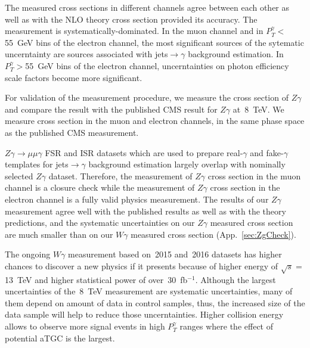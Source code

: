The measured cross sections in different channels agree between each other as well as with the NLO theory cross section provided its accuracy. The measurement is systematically-dominated. In the muon channel and in $P_T^{\gamma}<$55~GeV bins of the electron channel, the most significant sources of the sytematic uncerntainty are sources associated with jets$\rightarrow\gamma$ background estimation. In $P_T^{\gamma}>$55~GeV bins of the electron channel, uncerntainties on photon efficiency scale factors become more significant.

For validation of the measurement procedure, we measure the cross section of $Z\gamma$ and compare the result with the published CMS result for $Z\gamma$ at~8~TeV. We measure cross section in the muon and electron channels, in the same phase space as the published CMS measurement. 

$Z\gamma\rightarrow\mu\mu\gamma$ FSR and ISR datasets which are used to prepare real-$\gamma$ and fake-$\gamma$ templates for jets$\rightarrow\gamma$ background estimation largely overlap with nominally selected $Z\gamma$ dataset. Therefore, the measurement of $Z\gamma$ cross section in the muon channel is a closure check while the measurement of $Z\gamma$ cross section in the electron channel is a fully valid physics measurement. The results of our $Z\gamma$ measurement agree well with the published results as well as with the theory predictions, and the systematic uncertainties on our $Z\gamma$ measured cross section are much smaller than on our $W\gamma$ measured cross section (App.~\ref{sec:ZgCheck}).

The ongoing $W\gamma$ measurement based on~2015 and~2016 datasets has higher chances to discover a new physics if it presents because of higher energy of $\sqrt{s}=$13~TeV and higher statistical power of over~30~fb$^{-1}$. Although the largest uncertainties of the~8~TeV measurement are systematic uncertainties, many of them depend on amount of data in control samples, thus, the increased size of the data sample will help to reduce those uncerntainties. Higher collision energy allows to observe more signal events in high $P_T^{\gamma}$ ranges where the effect of potential aTGC is the largest. 

